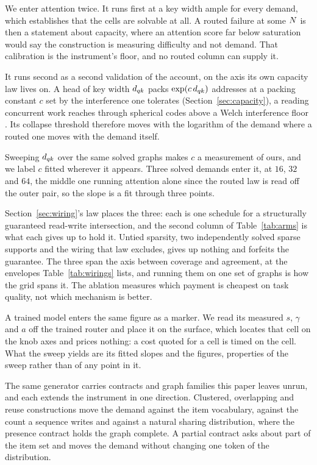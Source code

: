 We enter attention twice. It runs first at a key width ample for every demand, which establishes that the cells are solvable at all. A routed failure at some $N$ is then a statement about capacity, where an attention score far below saturation would say the construction is measuring difficulty and not demand. That calibration is the instrument's floor, and no routed column can supply it.

It runs second as a second validation of the account, on the axis its own capacity law lives on. A head of key width $d_{qk}$ packs $\exp(c\,d_{qk})$ addresses at a packing constant $c$ set by the interference one tolerates (Section~\ref{sec:capacity}), a reading concurrent work reaches through spherical codes above a Welch interference floor \citep{ghriss2026kata}. Its collapse threshold therefore moves with the logarithm of the demand where a routed one moves with the demand itself.

Sweeping $d_{qk}$ over the same solved graphs makes $c$ a measurement of ours, and we label $c$ fitted wherever it appears. Three solved demands enter it, at $16$, $32$ and $64$, the middle one running attention alone since the routed law is read off the outer pair, so the slope is a fit through three points.

Section~\ref{sec:wiring}'s law places the three: each is one schedule for a structurally guaranteed read-write intersection, and the second column of Table~\ref{tab:arms} is what each gives up to hold it. Untied sparsity, two independently solved sparse supports and the wiring that law excludes, gives up nothing and forfeits the guarantee. The three span the axis between coverage and agreement, at the envelopes Table~\ref{tab:wirings} lists, and running them on one set of graphs is how the grid spans it. The ablation measures which payment is cheapest on task quality, not which mechanism is better.

A trained model enters the same figure as a marker. We read its measured $s$, $\gamma$ and $a$ off the trained router and place it on the surface, which locates that cell on the knob axes and prices nothing: a cost quoted for a cell is timed on the cell. What the sweep yields are its fitted slopes and the figures, properties of the sweep rather than of any point in it.

The same generator carries contracts and graph families this paper leaves unrun, and each extends the instrument in one direction. Clustered, overlapping and reuse constructions move the demand against the item vocabulary, against the count a sequence writes and against a natural sharing distribution, where the presence contract holds the graph complete. A partial contract asks about part of the item set and moves the demand without changing one token of the distribution.

